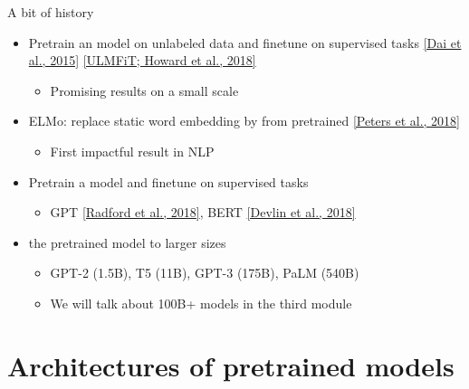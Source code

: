 \documentclass[usenames,dvipsnames,notes,11pt,aspectratio=169,hyperref={colorlinks=true, linkcolor=blue}]{beamer}
\begin{document}
\begin{frame}
    {A bit of history}
    \begin{itemize}[<+->]
        \item Pretrain an  model on unlabeled data and finetune on supervised tasks
            \href{https://arxiv.org/pdf/1511.01432.pdf}{[Dai et al., 2015]}
            \href{https://arxiv.org/pdf/1511.01432.pdf}{[ULMFiT; Howard et al., 2018]}
            \begin{itemize}[<.->]
                \item Promising results on a small scale
            \end{itemize}
        \item ELMo: replace static word embedding by  from pretrained  \href{https://arxiv.org/abs/1802.05365}{[Peters et al., 2018]}
            \begin{itemize}[<.->]
                \item First impactful result in NLP
            \end{itemize}
        \item Pretrain a  model and finetune on supervised tasks 
            \begin{itemize}[<.->]
                \item GPT \href{https://s3-us-west-2.amazonaws.com/openai-assets/research-covers/language-unsupervised/language_understanding_paper.pdf}{[Radford et al., 2018]},
                    BERT \href{https://arxiv.org/abs/1810.04805}{[Devlin et al., 2018]}
            \end{itemize}
        \item {} the pretrained model to larger sizes
            \begin{itemize}[<.->]
                \item GPT-2 (1.5B), T5 (11B), GPT-3 (175B), PaLM (540B) 
                \item We will talk about 100B+ models in the third module
            \end{itemize}
    \end{itemize}
\end{frame}

\section{Architectures of pretrained models}
\end{document}

